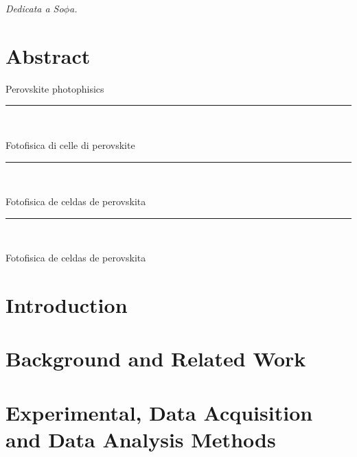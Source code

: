 \documentclass[b5paper, 12pt, openright]{book} %
\begin{document}
\cleardoublepage \vspace*{12cm}
\begin{flushright}
\large {\it Dedicata a So$\phi$a.}
\end{flushright}


\chapter[Abstract]{\centering Abstract}
\vfill
Perovskite photophisics

{
\vfill
\centering \rule{5cm}{1pt}\\
\vfill
}
\noindent
Fotofisica di celle di perovskite

{
	\vfill
	\centering \rule{5cm}{1pt}\\
	\vfill
}
\noindent

Fotofisica de celdas de perovskita

{
	\vfill
	\centering \rule{5cm}{1pt}\\
	\vfill
}
\noindent

Fotofisica de celdas de perovskita

\vfill


\restoregeometry


\mainmatter
\pagestyle{headings}


\chapter{Introduction}
	\graphicspath{ {./contents_img/intro/} }
	

\chapter{Background and Related Work}
	\graphicspath{ {./contents_img/background/} }
	

\chapter{Experimental, Data Acquisition and Data Analysis Methods}
	\graphicspath{ {./contents_img/methods/} }
	
\end{document}

